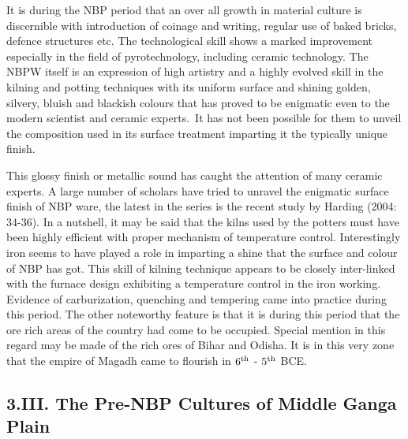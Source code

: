 It is during the NBP period that an over all growth in material culture is discernible with introduction of coinage and writing, regular use of baked bricks, defence structures etc. The technological skill shows a marked improvement especially in the field of pyrotechnology, including ceramic technology. The NBPW itself is an expression of high artistry and a highly evolved skill in the kilning and potting techniques with its uniform surface and shining golden, silvery, bluish and blackish colours that has proved to be enigmatic even to the modern scientist and ceramic experts.~It has not been possible for them to unveil the composition used in its surface treatment imparting it the typically unique finish.

This glossy finish or metallic sound has caught the attention of many ceramic experts. A large number of scholars have tried to unravel the enigmatic surface finish of NBP ware, the latest in the series is the recent study by Harding (2004: 34-36). In a nutshell, it may be said that the kilns used by the potters must have been highly efficient with proper mechanism of temperature control. Interestingly iron seems to have played a role in imparting a shine that the surface and colour of NBP has got.  This skill of kilning technique appears to be closely inter-linked with the furnace design exhibiting a temperature control in the iron working. Evidence of carburization, quenching and tempering came into practice during this period. The other noteworthy feature is that it is during this period that the ore rich areas of the country had come to be occupied. Special mention in this regard may be made of the rich ores of Bihar and Odisha. It is in this very zone that the empire of Magadh came to flourish in $6^{\rm th}$ - $5^{\rm th}$ BCE.

\vspace{-.3cm}

\subsection*{3.III. The Pre-NBP Cultures of Middle Ganga Plain}\label{subsection-10}

